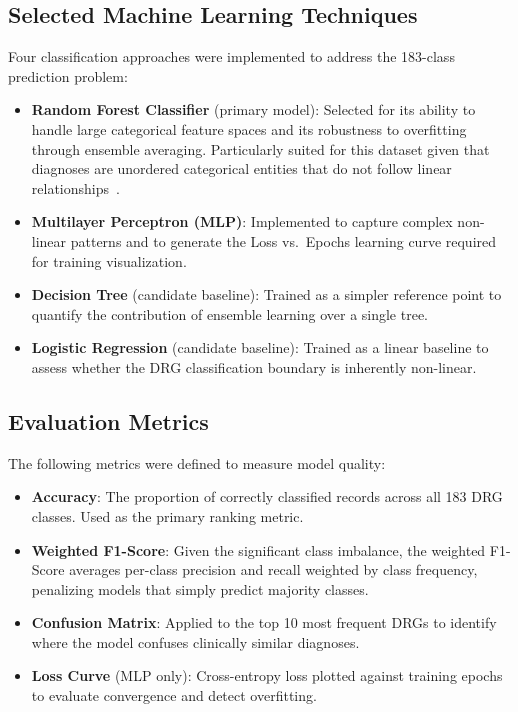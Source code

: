 \documentclass{IEEEtran}
\begin{document}
\subsection{Selected Machine Learning Techniques}
Four classification approaches were implemented to address the 183-class prediction problem:

\begin{itemize}
    \item \textbf{Random Forest Classifier} (primary model): Selected for its ability to handle large categorical feature spaces and its robustness to overfitting through ensemble averaging. Particularly suited for this dataset given that diagnoses are unordered categorical entities that do not follow linear relationships~\cite{breiman2001}.
    \item \textbf{Multilayer Perceptron (MLP)}: Implemented to capture complex non-linear patterns and to generate the Loss vs.\ Epochs learning curve required for training visualization.
    \item \textbf{Decision Tree} (candidate baseline): Trained as a simpler reference point to quantify the contribution of ensemble learning over a single tree.
    \item \textbf{Logistic Regression} (candidate baseline): Trained as a linear baseline to assess whether the DRG classification boundary is inherently non-linear.
\end{itemize}

\subsection{Evaluation Metrics}
The following metrics were defined to measure model quality:

\begin{itemize}
    \item \textbf{Accuracy}: The proportion of correctly classified records across all 183 DRG classes. Used as the primary ranking metric.
    \item \textbf{Weighted F1-Score}: Given the significant class imbalance, the weighted F1-Score averages per-class precision and recall weighted by class frequency, penalizing models that simply predict majority classes.
    \item \textbf{Confusion Matrix}: Applied to the top 10 most frequent DRGs to identify where the model confuses clinically similar diagnoses.
    \item \textbf{Loss Curve} (MLP only): Cross-entropy loss plotted against training epochs to evaluate convergence and detect overfitting.
\end{itemize}
\end{document}
